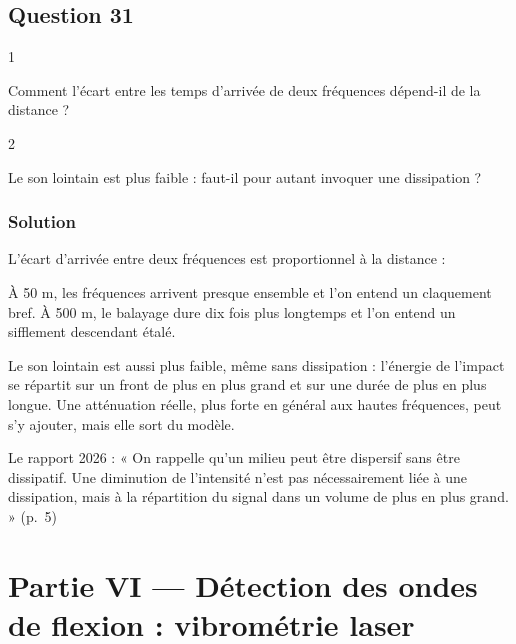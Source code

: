 \documentclass[11pt,a4paper]{article}
\newcommand{\equationajustee}[1]{%
  \sbox{\boiteequation}{$\displaystyle #1$}%
  \ifdim\wd\boiteequation>\linewidth
    \[\resizebox{\linewidth}{!}{\usebox{\boiteequation}}\]%
  \else
    \[#1\]%
  \fi}
\begin{document}
\hypertarget{question-31}{%
\subsection{Question 31}\label{question-31}}

\begin{indication}{1}

Comment l'écart entre les temps d'arrivée de deux fréquences dépend-il de la distance ?

\end{indication}

\begin{indication}{2}

Le son lointain est plus faible : faut-il pour autant invoquer une dissipation ?

\end{indication}

\hypertarget{solution-30}{%
\subsubsection{Solution}\label{solution-30}}

L'écart d'arrivée entre deux fréquences est proportionnel à la distance :

\equationajustee{\Delta t=x\left(\frac{1}{v_g(f_2)}-\frac{1}{v_g(f_1)}\right)}

À 50 m, les fréquences arrivent presque ensemble et l'on entend un claquement bref. À 500 m, le balayage dure dix fois plus longtemps et l'on entend un sifflement descendant étalé.

Le son lointain est aussi plus faible, même sans dissipation : l'énergie de l'impact se répartit sur un front de plus en plus grand et sur une durée de plus en plus longue. Une atténuation réelle, plus forte en général aux hautes fréquences, peut s'y ajouter, mais elle sort du modèle.

\begin{jury}

Le rapport 2026 : « On rappelle qu'un milieu peut être dispersif sans être dissipatif. Une diminution de l'intensité n'est pas nécessairement liée à une dissipation, mais à la répartition du signal dans un volume de plus en plus grand. » (p.~5)

\end{jury}

\hypertarget{partie-vi-duxe9tection-des-ondes-de-flexion-vibromuxe9trie-laser}{%
\section{Partie VI --- Détection des ondes de flexion : vibrométrie laser}\label{partie-vi-duxe9tection-des-ondes-de-flexion-vibromuxe9trie-laser}}
\end{document}
